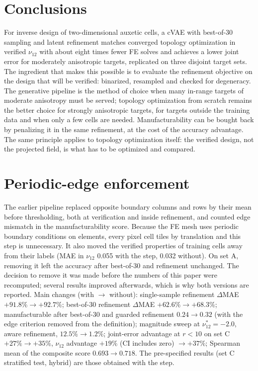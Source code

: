 \documentclass[a4paper,11pt]{article}
\newcommand{\nuot}{\nu_{12}}
\begin{document}
\section{Conclusions}
For inverse design of two-dimensional auxetic cells, a cVAE with best-of-30
sampling and latent refinement matches converged topology optimization in
verified $\nuot$ with about eight times fewer FE solves and achieves a lower
joint error for moderately anisotropic targets, replicated on three disjoint
target sets. The ingredient that makes this possible is to evaluate the
refinement objective on the design that will be verified: binarized,
resampled and checked for degeneracy. The generative pipeline is the method
of choice when many in-range targets of moderate anisotropy must be served;
topology optimization from scratch remains the better choice for strongly
anisotropic targets, for targets outside the training data and when only a
few cells are needed. Manufacturability can be bought back by penalizing it
in the same refinement, at the cost of the accuracy advantage. The same principle applies to
topology optimization itself: the verified design, not the projected field,
is what has to be optimized and compared.

\appendix
\section{Periodic-edge enforcement}
\label{app:fp}
The earlier pipeline replaced opposite boundary columns and rows by their
mean before thresholding, both at verification and inside refinement, and
counted edge mismatch in the manufacturability score. Because the FE mesh
uses periodic boundary conditions on elements, every pixel cell tiles by
translation and this step is unnecessary. It also moved the verified
properties of training cells away from their labels (MAE in $\nuot$ 0.055
with the step, 0.032 without). On set A, removing it left the accuracy after
best-of-30 and refinement unchanged. The decision to remove it was made
before the numbers of this paper were recomputed; several results improved
afterwards, which is why both versions are reported. Main changes (with
$\to$ without): single-sample refinement $\Delta$MAE $+91.8\%\to+92.7\%$;
best-of-30 refinement $\Delta$MAE $+62.6\%\to+68.3\%$; manufacturable after
best-of-30 and guarded refinement $0.24\to0.32$ (with the edge criterion
removed from the definition); magnitude sweep at $\nuot^{*}=-2.0$, aware
refinement, $12.5\%\to1.2\%$; joint-error advantage at $r<10$ on set C
$+27\%\to+35\%$, $\nuot$ advantage $+19\%$ (CI includes zero) $\to+37\%$;
Spearman mean of the composite score $0.693\to0.718$. The pre-specified
results (set C stratified test, hybrid) are those obtained with the step.
\end{document}
